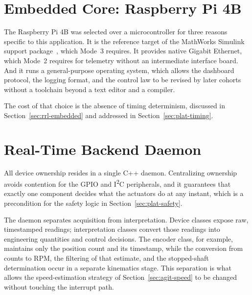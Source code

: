 

\section{Embedded Core: Raspberry Pi 4B}
\label{sec:plat-core}

The Raspberry Pi 4B was selected over a microcontroller for three reasons specific to this application. It is the reference target of the MathWorks Simulink support package~\citep{mathworks2026}, which Mode~3 requires. It provides native Gigabit Ethernet, which Mode~2 requires for telemetry without an intermediate interface board. And it runs a general-purpose operating system, which allows the dashboard protocol, the logging format, and the control law to be revised by later cohorts without a toolchain beyond a text editor and a compiler.

The cost of that choice is the absence of timing determinism, discussed in Section~\ref{sec:rrl-embedded} and addressed in Section~\ref{sec:plat-timing}.



\section{Real-Time Backend Daemon}
\label{sec:plat-backend}

All device ownership resides in a single C++ daemon. Centralizing ownership avoids contention for the GPIO and I\textsuperscript{2}C peripherals, and it guarantees that exactly one component decides what the actuators do at any instant, which is a precondition for the safety logic in Section~\ref{sec:plat-safety}.


The daemon separates acquisition from interpretation. Device classes expose raw, timestamped readings; interpretation classes convert those readings into engineering quantities and control decisions. The encoder class, for example, maintains only the position count and its timestamp, while the conversion from counts to RPM, the filtering of that estimate, and the stopped-shaft determination occur in a separate kinematics stage. This separation is what allows the speed-estimation strategy of Section~\ref{sec:agit-speed} to be changed without touching the interrupt path.


